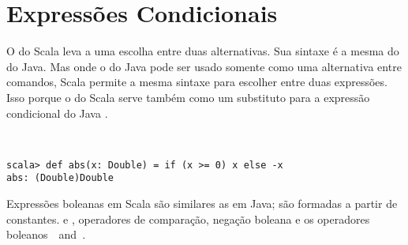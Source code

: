 
\section{Express\~{o}es Condicionais}
O  do Scala leva a uma escolha entre duas alternativas. Sua
sintaxe \'{e} a mesma do  do Java. Mas onde o  do 
Java pode ser usado somente como uma alternativa entre comandos, Scala 
permite a mesma sintaxe para escolher entre duas express\~{o}es. Isso porque o
 do Scala serve tamb\'{e}m como um substituto para a express\~{a}o 
condicional do Java .      


\example\
\begin{lstlisting}
scala> def abs(x: Double) = if (x >= 0) x else -x
abs: (Double)Double
\end{lstlisting}
Express\~{o}es boleanas em Scala s\~{a}o similares as em Java; s\~{a}o formadas
a partir de constantes.  
 e
, operadores de compara\c{c}\~{a}o, nega\c{c}\~{a}o boleana \code{!} e os 
operadores boleanos  $\,$\code{&&}$\,$ and $\,$\code{||}. 


